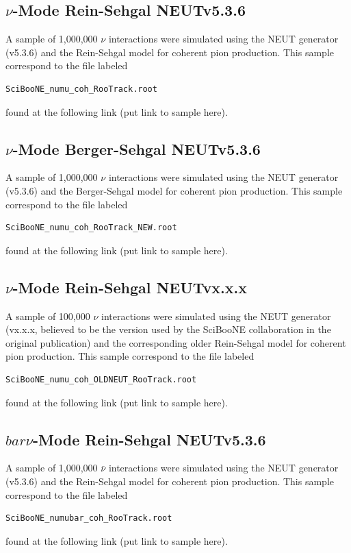 \documentclass[11pt]{article}
\begin{document}
\subsection{$\nu$-Mode Rein-Sehgal NEUTv5.3.6}
A sample of 1,000,000 $\nu$ interactions were simulated using the NEUT generator (v5.3.6) and the Rein-Sehgal model for coherent pion production. This sample correspond to the file labeled 
\begin{verbatim}
SciBooNE_numu_coh_RooTrack.root
\end{verbatim}
found at the following link (put link to sample here).

\subsection{$\nu$-Mode Berger-Sehgal NEUTv5.3.6}
A sample of 1,000,000 $\nu$ interactions were simulated using the NEUT generator (v5.3.6) and the Berger-Sehgal model for coherent pion production. This sample correspond to the file labeled
\begin{verbatim}
SciBooNE_numu_coh_RooTrack_NEW.root
\end{verbatim}
found at the following link (put link to sample here).



\subsection{$\nu$-Mode Rein-Sehgal NEUTvx.x.x}
A sample of 100,000 $\nu$ interactions were simulated using the NEUT generator (vx.x.x, believed to be the version used by the SciBooNE collaboration in the original publication) and the corresponding older Rein-Sehgal model for coherent pion production. This sample correspond to the file labeled
\begin{verbatim}
SciBooNE_numu_coh_OLDNEUT_RooTrack.root
\end{verbatim}
found at the following link (put link to sample here).


\subsection{$bar{\nu}$-Mode Rein-Sehgal NEUTv5.3.6}
A sample of 1,000,000 $\bar{\nu}$ interactions were simulated using the NEUT generator (v5.3.6) and the Rein-Sehgal model for coherent pion production. This sample correspond to the file labeled
\begin{verbatim}
SciBooNE_numubar_coh_RooTrack.root
\end{verbatim}
found at the following link (put link to sample here).
\end{document}
